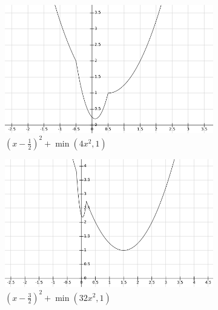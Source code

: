 \documentclass[abstracton]{scrreprt}
\begin{document}
            \begin{figure}[!ht]
                \centering
                \begin{subfigure}[b]{0.49\textwidth}
                    \begin{framed}
                        \includegraphics[width=\textwidth]{img/f_1.png}
                        \caption{$(x-\frac{1}{2})^{2} + \min(4x^{2}, 1)$}
                    \end{framed}
                \end{subfigure}
                \begin{subfigure}[b]{0.49\textwidth}
                    \begin{framed}
                        \includegraphics[width=\textwidth]{img/f_2.png}
                        \caption{$(x-\frac{3}{2})^{2} + \min(32x^{2}, 1)$}
                    \end{framed}
                \end{subfigure}
                \begin{subfigure}[b]{0.49\textwidth}

\end{subfigure}
\end{figure}
\end{document}
